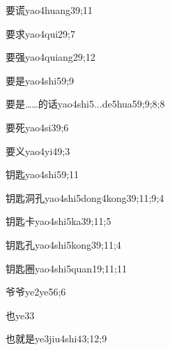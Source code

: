 \begin{verbete}{要谎}{yao4huang3}{9;11}
\end{verbete}
\begin{verbete}{要求}{yao4qui2}{9;7}
\end{verbete}
\begin{verbete}{要强}{yao4quiang2}{9;12}
\end{verbete}
\begin{verbete}{要是}{yao4shi5}{9;9}
\end{verbete}
\begin{verbete}{要是……的话}{yao4shi5...de5hua5}{9;9;8;8}
\end{verbete}
\begin{verbete}{要死}{yao4si3}{9;6}
\end{verbete}
\begin{verbete}{要义}{yao4yi4}{9;3}
\end{verbete}
\begin{verbete}{钥匙}{yao4shi5}{9;11}
\end{verbete}
\begin{verbete}{钥匙洞孔}{yao4shi5dong4kong3}{9;11;9;4}
\end{verbete}
\begin{verbete}{钥匙卡}{yao4shi5ka3}{9;11;5}
\end{verbete}
\begin{verbete}{钥匙孔}{yao4shi5kong3}{9;11;4}
\end{verbete}
\begin{verbete}{钥匙圈}{yao4shi5quan1}{9;11;11}
\end{verbete}
\begin{verbete}{爷爷}{ye2ye5}{6;6}
\end{verbete}
\begin{verbete}{也}{ye3}{3}
\end{verbete}
\begin{verbete}{也就是}{ye3jiu4shi4}{3;12;9}
\end{verbete}
